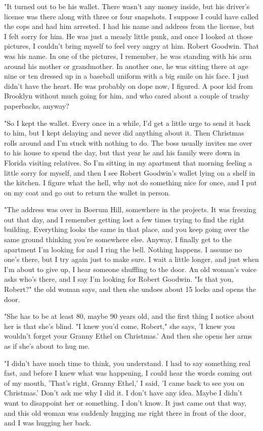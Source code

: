 \documentclass[10pt,a4paper]{article}
\begin{document}
"It turned out to be his wallet. There wasn't any money inside, but his driver's license was there along with three or four snapshots. I suppose I could have called the cops and had him arrested. I had his name and address from the license, but I felt sorry for him. He was just a measly little punk, and once I looked at those pictures, I couldn't bring myself to feel very angry at him. Robert Goodwin. That was his name. In one of the pictures, I remember, he was standing with his arm around his mother or grandmother. In another one, he was sitting there at age nine or ten dressed up in a baseball uniform with a big smile on his face. I just didn't have the heart. He was probably on dope now, I figured. A poor kid from Brooklyn without much going for him, and who cared about a couple of trashy paperbacks, anyway?

"So I kept the wallet. Every once in a while, I'd get a little urge to send it back to him, but I kept delaying and never did anything about it. Then Christmas rolls around and I'm stuck with nothing to do. The boss usually invites me over to his house to spend the day, but that year he and his family were down in Florida visiting relatives. So I'm sitting in my apartment that morning feeling a little sorry for myself, and then I see Robert Goodwin's wallet lying on a shelf in the kitchen. I figure what the hell, why not do something nice for once, and I put on my coat and go out to return the wallet in person.

"The address was over in Boerum Hill, somewhere in the projects. It was freezing out that day, and I remember getting lost a few times trying to find the right building. Everything looks the same in that place, and you keep going over the same ground thinking you're somewhere else. Anyway, I finally get to the apartment I'm looking for and I ring the bell. Nothing happens. I assume no one's there, but I try again just to make sure. I wait a little longer, and just when I'm about to give up, I hear someone shuffling to the door. An old woman's voice asks who's there, and I say I'm looking for Robert Goodwin. "Is that you, Robert?" the old woman says, and then she undoes about 15 locks and opens the door.

"She has to be at least 80, maybe 90 years old, and the first thing I notice about her is that she's blind. "I knew you'd come, Robert," she says, 'I knew you wouldn't forget your Granny Ethel on Christmas.' And then she opens her arms as if she's about to hug me.

"I didn't have much time to think, you understand. I had to say something real fast, and before I knew what was happening, I could hear the words coming out of my mouth, 'That's right, Granny Ethel,' I said, 'I came back to see you on Christmas.' Don't ask me why I did it. I don't have any idea. Maybe I didn't want to disappoint her or something. I don't know. It just came out that way, and this old woman was suddenly hugging me right there in front of the door, and I was hugging her back.
\end{document}

